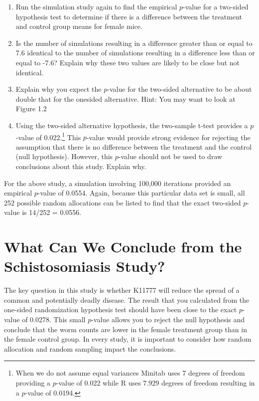 \documentclass[
]{book}
\begin{document}
\begin{enumerate}
\def\labelenumi{\arabic{enumi}.}
\setcounter{enumi}{12}
\item
  Run the simulation study again to find the empirical \(p\)-value for a two-sided hypothesis test to determine if there is a difference between the treatment and control group means for female mice.
\item
  Is the number of simulations resulting in a difference greater than or equal to 7.6 identical to the number of simulations resulting in a difference less than or equal to -7.6? Explain why these two values are likely to be close but not identical.
\item
  Explain why you expect the \(p\)-value for the two-sided alternative to be about double that for the onesided alternative. Hint: You may want to look at Figure 1.2
\item
  Using the two-sided alternative hypothesis, the two-sample t-test provides a \(p\)-value of 0.022.\footnote{When we do not assume equal variances Minitab uses 7 degrees of freedom providing a \(p\)-value of 0.022 while R uses 7.929 degrees of freedom resulting in a \(p\)-value of 0.0194.} This \(p\)-value would provide strong evidence for rejecting the assumption that there is no difference between the treatment and the control (null hypothesis). However, this \(p\)-value should not be used to draw conclusions about this study. Explain why.
\end{enumerate}

For the above study, a simulation involving 100,000 iterations provided an empirical \(p\)-value of 0.0554. Again, because this particular data set is small, all 252 possible random allocations can be listed to find that the exact two-sided \(p\)-value is 14/252 = 0.0556.

\hypertarget{what-can-we-conclude-from-the-schistosomiasis-study}{%
\section{What Can We Conclude from the Schistosomiasis Study?}\label{what-can-we-conclude-from-the-schistosomiasis-study}}

The key question in this study is whether K11777 will reduce the spread of a common and potentially deadly disease. The result that you calculated from the one-sided randomization hypothesis test should have been close to the exact \(p\)-value of 0.0278. This small \(p\)-value allows you to reject the null hypothesis and conclude that the worm counts are lower in the female treatment group than in the female control group. In every study, it is important to consider how random allocation and random sampling impact the conclusions.
\end{document}
